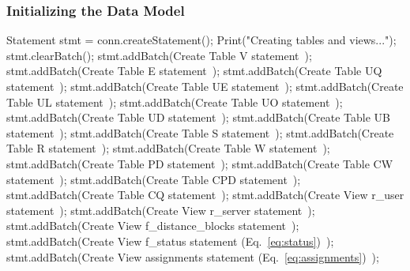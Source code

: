 \documentclass{article}
\theoremstyle{definition}
\begin{document}
\subsubsection{Initializing the Data Model}
\label{sec:initializing-the-data-model}
\nwenddocs{}\endmoddef{}
Statement stmt = conn.createStatement();
Print("Creating tables and views...");
stmt.clearBatch();
stmt.addBatch(\LA{}Create Table V statement~{\nwtagstyle{}}\RA{});
stmt.addBatch(\LA{}Create Table E statement~{\nwtagstyle{}}\RA{});
stmt.addBatch(\LA{}Create Table UQ statement~{\nwtagstyle{}}\RA{});
stmt.addBatch(\LA{}Create Table UE statement~{\nwtagstyle{}}\RA{});
stmt.addBatch(\LA{}Create Table UL statement~{\nwtagstyle{}}\RA{});
stmt.addBatch(\LA{}Create Table UO statement~{\nwtagstyle{}}\RA{});
stmt.addBatch(\LA{}Create Table UD statement~{\nwtagstyle{}}\RA{});
stmt.addBatch(\LA{}Create Table UB statement~{\nwtagstyle{}}\RA{});
stmt.addBatch(\LA{}Create Table S statement~{\nwtagstyle{}}\RA{});
stmt.addBatch(\LA{}Create Table R statement~{\nwtagstyle{}}\RA{});
stmt.addBatch(\LA{}Create Table W statement~{\nwtagstyle{}}\RA{});
stmt.addBatch(\LA{}Create Table PD statement~{\nwtagstyle{}}\RA{});
stmt.addBatch(\LA{}Create Table CW statement~{\nwtagstyle{}}\RA{});
stmt.addBatch(\LA{}Create Table CPD statement~{\nwtagstyle{}}\RA{});
stmt.addBatch(\LA{}Create Table CQ statement~{\nwtagstyle{}}\RA{});
stmt.addBatch(\LA{}Create View r\_user statement~{\nwtagstyle{}}\RA{});
stmt.addBatch(\LA{}Create View r\_server statement~{\nwtagstyle{}}\RA{});
stmt.addBatch(\LA{}Create View f\_distance\_blocks statement~{\nwtagstyle{}}\RA{});
stmt.addBatch(\LA{}Create View f\_status statement (Eq.~\ref{eq:status})~{\nwtagstyle{}}\RA{});
stmt.addBatch(\LA{}Create View assignments statement (Eq.~\ref{eq:assignments})~{\nwtagstyle{}}\RA{});
\end{document}
